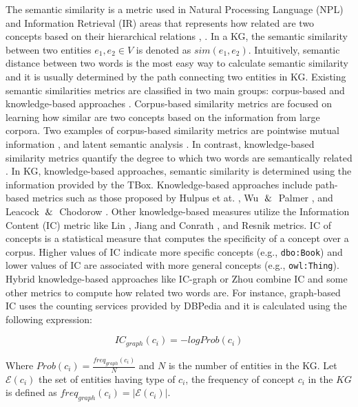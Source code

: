 \documentclass{ieeeaccess}
\begin{document}
The semantic similarity is a metric used in Natural Processing Language 
(NPL) and Information Retrieval (IR) areas \cite{HOVY20132} that
represents how related are two concepts based on their hierarchical 
relations \cite{resnik1995using}, \cite{turney2010frequency}. 
In a KG, the semantic similarity between two entities $e_{1}, e_{2} \in V$
is denoted as $sim(e_{1}, e_{2})$. Intuitively, semantic distance between
two words is the most easy way to calculate semantic similarity and it is
usually determined by the path connecting two entities in KG. Existing 
semantic similarities metrics are classified in two main groups: corpus-based 
and knowledge-based approaches \cite{mihalcea2006corpus}. Corpus-based 
similarity metrics are focused on learning how similar are two concepts based 
on the information from large corpora. Two examples of corpus-based similarity
metrics are pointwise mutual information \cite{church1990word}, and latent 
semantic analysis \cite{landauer1997solution}. In contrast, knowledge-based
similarity metrics quantify the degree to which two words are 
semantically related \cite{budanitsky2001semantic}. In KG, knowledge-based
approaches, semantic similarity is determined using the information provided 
by the TBox. Knowledge-based approaches include path-based metrics such as
those proposed by Hulpus et at. \cite{hulpucs2015path}, Wu $\And$ Palmer
\cite{wu1994verb}, and Leacock $\And$ Chodorow \cite{leacock1998combining}.
Other knowledge-based measures utilize the Information Content (IC) metric like 
Lin \cite{lin1998information}, Jiang and Conrath \cite{jiang1997semantic}, 
and Resnik \cite{resnik1995using} metrics. IC of concepts is a statistical
measure that computes the specificity of a concept over a corpus. Higher 
values of IC indicate more specific concepts (e.g., \texttt{dbo:Book}) and lower 
values of IC are associated with more general concepts (e.g., \texttt{owl:Thing}).
Hybrid knowledge-based approaches like IC-graph \cite{ZhuIglesias2017} or Zhou
\cite{zhou2008new} combine IC and some other metrics to compute how related two 
words are. For instance, graph-based IC \cite{ZhuIglesias2017} uses 
the counting services provided by DBPedia and it is calculated using the 
following expression:

\begin{equation}
    IC_{graph}(c_{i}) = -logProb(c_{i})
\end{equation}

Where $Prob(c_{i}) = \frac{freq_{graph}(c_{i})}{N}$ and $N$ is the 
number of entities in the KG. Let $\mathcal{E}(c_{i})$ the set of 
entities having type of $c_{i}$, the frequency of concept $c_{i}$
in the $KG$ is defined as $freq_{graph}(c_{i}) = |\mathcal{E}(c_{i})|$.
\end{document}
